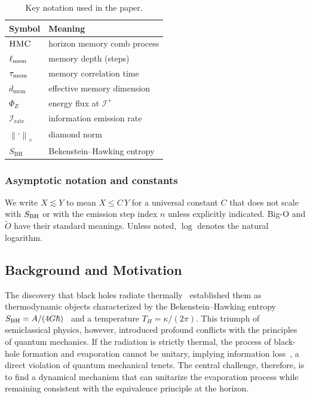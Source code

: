 \documentclass[aps,prd,preprint,onecolumn,superscriptaddress,nofootinbib,longbibliography,floatfix,11pt,showpacs,showkeys]{revtex4-2}
\newcommand{\normD}[1]{\left\lVert #1 \right\rVert_{\diamond}}
\newcommand{\Irate}{\mathcal{I}_{\mathrm{rate}}}
\newcommand{\Eflux}{\Phi_E}
\newcommand{\Ddiamond}[1]{\normD{#1}}
\newcommand{\HMC}{\textsc{HMC}\xspace}
\newcommand{\dmem}{\ensuremath{d_{\mathrm{mem}}}}
\newcommand{\SBH}{\ensuremath{S_{\mathrm{BH}}}}
\theoremstyle{plain}
\theoremstyle{definition}
\theoremstyle{remark}
\begin{document}
\begin{table}[t]
  \centering
  \caption{Key notation used in the paper.}
  \label{tab:notation}
  \small
  \begin{tabular*}{\textwidth}{@{\extracolsep{\fill}}ll@{}}
    \toprule
    \textbf{Symbol} & \textbf{Meaning} \\
    \midrule
    $\HMC$ & horizon memory comb process \\
    $\ell_{\rm mem}$ & memory depth (steps) \\
    $\tau_{\rm mem}$ & memory correlation time \\
    $\dmem$ & effective memory dimension \\
    $\Eflux$ & energy flux at $\mathscr{I}^+$ \\
    $\Irate$ & information emission rate \\
    $\Ddiamond{\cdot}$ & diamond norm \\
    $\SBH$ & Bekenstein--Hawking entropy \\
    \bottomrule
  \end{tabular*}
\end{table}

\subsubsection{Asymptotic notation and constants}
We write $X\lesssim Y$ to mean $X\le C\,Y$ for a universal constant $C$ that does not scale with $S_{\rm BH}$
or with the emission step index $n$ unless explicitly indicated. Big-O and $\tilde O$ have their standard
meanings. Unless noted, $\log$ denotes the natural logarithm.

\subsection{Background and Motivation}
The discovery that black holes radiate thermally~\cite{Hawking:1975} established them as thermodynamic objects characterized by the Bekenstein--Hawking entropy $S_{\rm BH} = A/(4G\hbar)$~\cite{Bekenstein:1973} and a temperature $T_H = \kappa/(2\pi)$. This triumph of semiclassical physics, however, introduced profound conflicts with the principles of quantum mechanics. If the radiation is strictly thermal, the process of black\nobreakdash-hole formation and evaporation cannot be unitary, implying information loss~\cite{Hawking:1976}, a direct violation of quantum mechanical tenets. The central challenge, therefore, is to find a dynamical mechanism that can unitarize the evaporation process while remaining consistent with the equivalence principle at the horizon.
\end{document}
